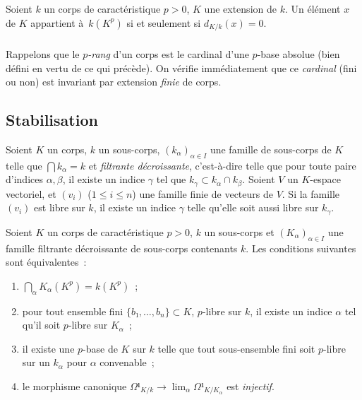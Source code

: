 \documentclass[10pt]{../fichiers-configuration-latex/smfart}
\begin{document}
\begin{corollaire2}
\label{4-dérivée nulle}
Soient $k$ un corps de caractéristique $p>0$, $K$ une extension de $k$.
Un élément $x$ de $K$ appartient à $k(K^p)$ si et seulement si
$d_{K/k}(x)=0$.
\end{corollaire2}

\subsubsection{}Rappelons que le \emph{$p$-rang} d'un corps est le cardinal
d'une $p$-base absolue (bien défini en vertu de ce qui précède).
On vérifie immédiatement que ce \emph{cardinal} (fini ou non) est invariant par
extension \emph{finie} de corps.

\subsection{Stabilisation}

\begin{lemme2}
Soient $K$ un corps, $k$ un sous-corps, $(k_α)_{α∈I}$ une famille
de sous-corps de $K$ telle que $⋂k_α=k$ et
\emph{filtrante décroissante}, 
c'est-à-dire telle que pour toute paire d'indices $α,β$, il existe un indice
$γ$ tel que $k_γ ⊂ k_α ∩ k_β$.
Soient $V$ un $K$-espace
vectoriel,  et $(v_i)$ ($1≤i≤n$) une famille finie de vecteurs de $V$.
Si la famille $(v_i)$ est libre sur $k$, il existe un indice $γ$ telle qu'elle
soit aussi libre sur $k_γ$.
\end{lemme2}

\begin{lemme2}
Soient $K$ un corps de caractéristique $p>0$, $k$ un sous-corps et 
$(K_α)_{α∈I}$ une famille filtrante décroissante de sous-corps contenants
$k$.
Les conditions suivantes sont équivalentes :
\begin{enumerate}
\item $⋂_α K_α(K^p)=k(K^p)$ ; 
\item pour tout ensemble fini $\{b₁,\dots,b_n\}⊂K$, $p$-libre sur $k$, il existe
un indice $α$ tel qu'il soit $p$-libre sur $K_α$ ;  
\item il existe une $p$-base de $K$ sur $k$ telle que tout sous-ensemble fini 
soit $p$-libre sur un $k_α$ pour $α$ convenable ; 
\item le morphisme canonique $Ω¹_{K/k}→ \lim_α   Ω¹_{K/K_α}$ est \emph{injectif}.
\end{enumerate}
\end{lemme2}
\end{document}
